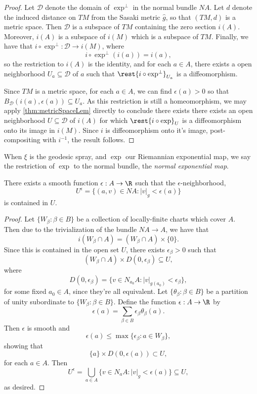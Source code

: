 \begin{proof}
Let $\mathcal{D}$ denote the domain of $\exp^\perp$ in the normal bundle $NA$.  Let $d$ denote the induced distance on $TM$ from the Sasaki metric $\hat{g}$, so that $(TM,d)$ is a metric space.  Then $\mathcal{D}$ is a subspace of $TM$ containing the zero section $i(A)$.  Moreover, $i(A)$ is a subspace of $i(M)$ which is a subspace of $TM$.  Finally, we have that $i\circ\exp^\perp:\mathcal{D}\to i(M)$, where
$$i\circ\exp^\perp(i(a))=i(a),$$
so the restriction to $i(A)$ is the identity, and for each $a\in A$, there exists a open neighborhood $U_a\subseteq\mathcal{D}$ of $a$ such that $\rest{i\circ\exp^\perp}_{U_a}$ is a diffeomorphism.

Since $TM$ is a metric space, for each $a\in A$, we can find $\epsilon(a)>0$ so that $B_{\mathcal{D}}(i(a),\epsilon(a))\subseteq U_a$.  As this restriction is still a homeomorphism, we may apply \cref{thm:metricSpaceLem} directly to conclude there exists there exists an open neighborhood $U\subseteq\mathcal{D}$ of $i(A)$ for which $\rest{i\circ\exp}_U$ is a diffeomorphism onto its image in $i(M)$.  Since $i$ is diffeomorphism onto it's image, post-compositing with $i^{-1}$, the result follows.
\end{proof}

When $\xi$ is the geodesic spray, and $\exp$ our Riemannian exponential map, we say the restriction of $\exp$ to the normal bundle, the \textit{normal exponential map}.

\begin{lem}
    There exists a smooth function $\epsilon:A\to\R$ such that the $\epsilon$-neighborhood,
    $$U^\epsilon=\{(a,v)\in NA:|v|_g<\epsilon(a)\}$$
    is contained in $U$.
\end{lem}

\begin{proof}
Let $\{W_\beta:\beta\in B\}$ be a collection of locally-finite charts which cover $A$.  Then due to the trivialization of the bundle $NA\to A$, we have that 
$$i(W_\beta\cap A)=(W_\beta\cap A)\times\{0\}.$$
Since this is contained in the open set $U$, there exists $\epsilon_\beta>0$ such that
$$(W_\beta\cap A)\times D(0,\epsilon_\beta)\subseteq U,$$
where
$$D(0,\epsilon_\beta)=\{v\in N_{a_0}A: |v|_{g(a_0)}<\epsilon_\beta\},$$
for some fixed $a_0\in A$, since they're all equivalent.  Let $\{\theta_\beta:\beta\in B\}$ be a partition of unity subordinate to $\{W_\beta:\beta\in B\}$.  Define the function $\epsilon:A\to\R$ by
$$\epsilon(a)=\sum_{\beta\in B}\epsilon_\beta\theta_\beta(a).$$
Then $\epsilon$ is smooth and
$$\epsilon(a)\leq\max\{\epsilon_\beta:a\in W_\beta\},$$
showing that
$$\{a\}\times D(0,\epsilon(a))\subset U,$$
for each $a\in A$.  Then
$$U^\epsilon=\bigcup_{a\in A}\{v\in N_aA:|v|_g<\epsilon(a)\}\subseteq U,$$
as desired.
\end{proof}



